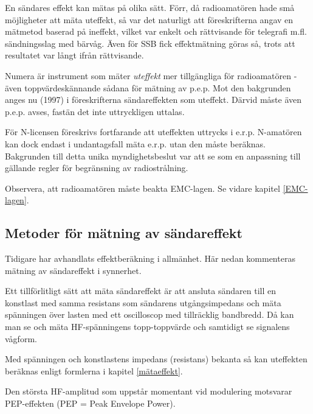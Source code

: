 \begin{rev-omarbetas}
En sändares effekt kan mätas på olika sätt.  Förr, då radioamatören
hade små möjligheter att mäta uteffekt, så var det naturligt att
föreskrifterna angav en mätmetod baserad på ineffekt, vilket var
enkelt och rättvisande för telegrafi m.fl. sändningsslag med bärvåg.
Även för SSB fick effektmätning göras så, trots att resultatet var
långt ifrån rättvisande.

Numera är instrument som mäter \emph{uteffekt} mer tillgängliga för
radioamatören - även toppvärdeskännande sådana för mätning av
p.e.p. Mot den bakgrunden anges nu (1997) i föreskrifterna
sändareffekten som uteffekt.  Därvid måste även p.e.p. avses, fastän
det inte uttryckligen uttalas.

\end{rev-omarbetas}

\begin{rev-raderas}
För N-licensen föreskrivs fortfarande att uteffekten uttrycks i
e.r.p. N-amatören kan dock endast i undantagsfall mäta e.r.p. utan den
måste beräknas. Bakgrunden till detta unika myndighetsbeslut var att
se som en anpassning till gällande regler för begränsning av
radiostrålning.

\end{rev-raderas}

Observera, att radioamatören måste beakta EMC-lagen. Se vidare kapitel
\ref{EMC-lagen}.

\subsection{Metoder för mätning av sändareffekt}

Tidigare har avhandlats effektberäkning i allmänhet. Här nedan
kommenteras mätning av sändareffekt i synnerhet.

Ett tillförlitligt sätt att mäta sändareffekt är att ansluta sändaren
till en konstlast med samma resistans som sändarens utgångsimpedans
och mäta spänningen över lasten med ett oscilloscop med tillräcklig
bandbredd. Då kan man se och mäta HF-spänningens topp-toppvärde och
samtidigt se signalens vågform.

Med spänningen och konstlastens impedans (resistans) bekanta så kan
uteffekten beräknas enligt formlerna i kapitel \ref{mätaeffekt}.

Den största HF-amplitud som uppstår momentant vid modulering motsvarar
PEP-effekten (PEP = Peak Envelope Power).

